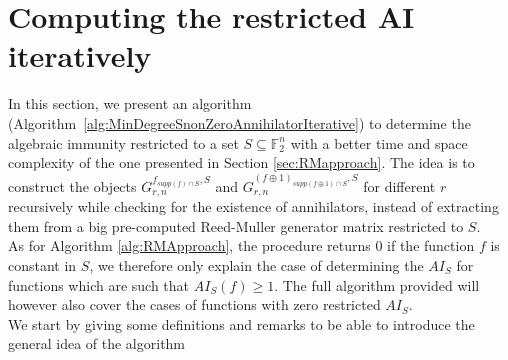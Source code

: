 \documentclass[11pt]{llncs}
\begin{document}



\section{Computing the restricted AI iteratively}\label{sec:IterativeApproach}


In this section, we present an algorithm (Algorithm~\ref{alg:MinDegreeSnonZeroAnnihilatorIterative}) to determine the algebraic immunity restricted to a set $S \subseteq \mathbb{F}_2^n$ with a better time and space complexity of the one presented in Section \ref{sec:RMapproach}.
The idea is to construct the objects $G_{r,n}^{f_{supp\left(f\right) \cap S},S}$ and $G_{r,n}^{\left(f\oplus 1\right)_{supp\left(f\oplus 1\right) \cap S},S}$ for different $r$ recursively while checking for the existence of annihilators, instead of extracting them from a big pre-computed Reed-Muller generator matrix restricted to $S$.\\
As for Algorithm \ref{alg:RMApproach}, the procedure returns $0$ if the function $f$ is constant in $S$, we therefore only explain the case of determining the $AI_S$ for functions which are such that $AI_S(f) \geq 1$. The full algorithm provided will however also cover the cases of functions with zero restricted $AI_S$.\\

We start by giving some definitions and remarks to be able to introduce the general idea of the algorithm
\end{document}

